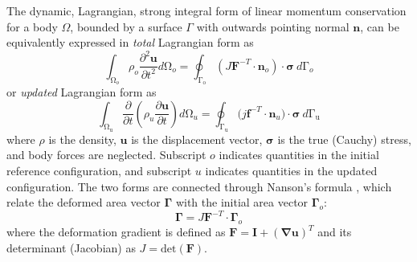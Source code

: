 \documentclass[sn-mathphys,Numbered,draft]{sn-jnl}%
\begin{document}
The dynamic, Lagrangian, strong integral form of linear momentum conservation for a body $\Omega$, bounded by a surface $\Gamma$ with outwards pointing normal $\textbf{n}$, can be equivalently expressed in \emph{total} Lagrangian form as
\begin{equation} \label{eqn:totalLagFormulation}
    \int_{\mathrm{\Omega}_o} \rho_o \frac{\partial^2 \mathbf{u} }{\partial t^2} d\mathrm{\Omega}_o
    =
    \oint_{\mathrm{\Gamma_o}} \left( J \mathbf{F}^{-T} \cdot \mathbf{n}_o \right) \cdot \boldsymbol{\sigma} \ d\mathrm{\Gamma}_o
\end{equation}
or \emph{updated} Lagrangian form as
\begin{equation} \label{eqn:updatedLagFormulation}
    \int_{\mathrm{\Omega_u}} \frac{\partial }{\partial t} \left( \rho_u \frac{\partial \mathbf{u} }{\partial t} \right) d\mathrm{\Omega}_u
    = \oint_{\mathrm{\Gamma_u}}(j\mathbf{f}^{-T}\cdot{\mathbf{n}_u)\cdot\boldsymbol{\sigma}}\ d\mathrm{\Gamma_u}
\end{equation}
where $\rho$ is the density, $\mathbf{u}$ is the displacement vector, $\boldsymbol{\sigma}$ is the true (Cauchy) stress, and body forces are neglected.
Subscript $o$ indicates quantities in the initial reference configuration, and subscript $u$ indicates quantities in the updated configuration.
The two forms are connected through Nanson’s formula \cite{bathe_finite_1996}, which relate the deformed area vector $\mathbf{\Gamma}$ with the initial area vector $\mathbf{\Gamma}_{o}$:
\begin{equation}
    \mathbf{\Gamma} = J\mathbf{F}^{-T}\cdot\mathbf{\Gamma}_o
\end{equation}
where the deformation gradient is defined as $\mathbf{F} = \textbf{I} + (\boldsymbol{\nabla} \boldsymbol{u})^T$ and its determinant (Jacobian) as $J = \text{det}(\boldsymbol{F})$.
\end{document}
